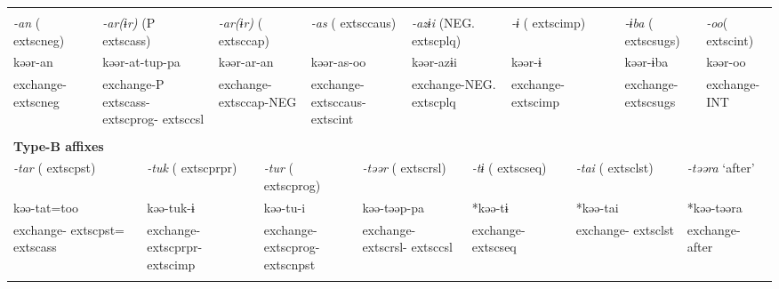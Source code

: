 \tabletail{}
\tablelasttail{}
\begin{tabularx}{\textwidth}{XXXXXXXXXXXXXXXXXXXX}
\lsptoprule
\multicolumn{20}{X}{{\bfseries Type-A affixes}}\\
{ \textit{{}-an} (	extsc{neg})} & \multicolumn{3}{X}{{ \textit{{}-ar(ɨr)} (P	extsc{ass})}} & \multicolumn{4}{X}{{ \textit{{}-ar(ɨr)} (	extsc{cap})}} & \multicolumn{4}{X}{{ \textit{{}-as} (	extsc{caus})}} & \multicolumn{3}{X}{{ \textit{{}-azɨi} (NEG.	extsc{plq})}} & \multicolumn{2}{X}{{ \textit{{}-ɨ} (	extsc{imp})}} & \multicolumn{2}{X}{{ \textit{{}-ɨba} (	extsc{sugs})}} & { \textit{{}-oo}(	extsc{int})}\\
{ kəər-an} & \multicolumn{3}{X}{{ kəər-at-tup-pa}} & \multicolumn{4}{X}{{ kəər-ar-an}} & \multicolumn{4}{X}{{ kəər-as-oo}} & \multicolumn{3}{X}{{ kəər-azɨi}} & \multicolumn{2}{X}{{ kəər-ɨ}} & \multicolumn{2}{X}{{ kəər-ɨba}} & { kəər-oo}\\
exchange-	extsc{neg} & \multicolumn{3}{X}{exchange-P	extsc{ass}-	extsc{prog}-	extsc{csl}} & \multicolumn{4}{X}{exchange-	extsc{cap}-NEG} & \multicolumn{4}{X}{exchange-	extsc{caus}-	extsc{int}} & \multicolumn{3}{X}{exchange-NEG.	extsc{plq}} & \multicolumn{2}{X}{exchange-	extsc{imp}} & \multicolumn{2}{X}{exchange-	extsc{sugs}} & exchange-INT\\
\multicolumn{20}{X}{}\\
\multicolumn{20}{X}{{\bfseries Type-B affixes}}\\
\multicolumn{2}{X}{{ \textit{{}-tar} (	extsc{pst})}} & \multicolumn{4}{X}{{ \textit{{}-tuk} (	extsc{prpr})}} & \multicolumn{5}{X}{{ \textit{{}-tur} (	extsc{prog})}} & \multicolumn{3}{X}{{ \textit{{}-təər} (	extsc{rsl})}} & \multicolumn{2}{X}{{ \textit{{}-tɨ} (	extsc{seq})}} & \multicolumn{2}{X}{{ \textit{{}-tai} (	extsc{lst})}} & \multicolumn{2}{X}{{ \textit{{}-təəra} ‘after’}}\\
\multicolumn{2}{X}{{ kəə-tat=too}} & \multicolumn{4}{X}{{ kəə-tuk-ɨ}} & \multicolumn{5}{X}{{ kəə-tu-i}} & \multicolumn{3}{X}{{ kəə-təəp-pa}} & \multicolumn{2}{X}{{ *kəə-tɨ}} & \multicolumn{2}{X}{{ *kəə-tai}} & \multicolumn{2}{X}{{ *kəə-təəra}}\\
\multicolumn{2}{X}{exchange-	extsc{pst}=	extsc{ass}} & \multicolumn{4}{X}{exchange-	extsc{prpr}-	extsc{imp}} & \multicolumn{5}{X}{exchange-	extsc{prog}-	extsc{npst}} & \multicolumn{3}{X}{exchange-	extsc{rsl}-	extsc{csl}} & \multicolumn{2}{X}{exchange-	extsc{seq}} & \multicolumn{2}{X}{exchange-	extsc{lst}} & \multicolumn{2}{X}{{ exchange-after}}\\
\multicolumn{2}{X}{} & \multicolumn{4}{X}{} & \multicolumn{5}{X}{} & \multicolumn{3}{X}{} & \multicolumn{2}{X}{} & \multicolumn{2}{X}{} & \multicolumn{2}{X}{}\\

\end{tabularx}
